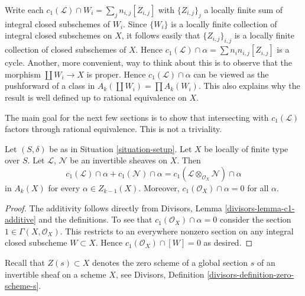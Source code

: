 \noindent
Write each $c_1(\mathcal{L}) \cap W_i = \sum_j n_{i, j} [Z_{i, j}]$
with $\{Z_{i, j}\}_j$ a locally finite sum
of integral closed subschemes of $W_i$. Since $\{W_i\}$ is a locally
finite collection of integral closed subschemes on $X$, it follows
easily that $\{Z_{i, j}\}_{i, j}$ is a locally finite collection
of closed subschemes of $X$. Hence
$c_1(\mathcal{L}) \cap \alpha = \sum n_in_{i, j}[Z_{i, j}]$
is a cycle. Another, more convenient, way to think about this
is to observe that the morphism $\coprod W_i \to X$ is
proper. Hence $c_1(\mathcal{L}) \cap \alpha$ can be viewed
as the pushforward of a class in $A_k(\coprod W_i) = \prod A_k(W_i)$.
This also explains why the result is well defined up to rational
equivalence on $X$.

\medskip\noindent
The main goal for the next few sections is to show that intersecting with
$c_1(\mathcal{L})$ factors through rational equivalence.
This is not a triviality.

\begin{lemma}
\label{lemma-c1-cap-additive}
Let $(S, \delta)$ be as in Situation \ref{situation-setup}.
Let $X$ be locally of finite type over $S$.
Let $\mathcal{L}$, $\mathcal{N}$ be an invertible sheaves on $X$.
Then
$$
c_1(\mathcal{L}) \cap \alpha  + c_1(\mathcal{N}) \cap \alpha =
c_1(\mathcal{L} \otimes_{\mathcal{O}_X} \mathcal{N}) \cap \alpha
$$
in $A_k(X)$ for every $\alpha \in Z_{k - 1}(X)$. Moreover,
$c_1(\mathcal{O}_X) \cap \alpha = 0$ for all $\alpha$.
\end{lemma}

\begin{proof}
The additivity follows directly from
Divisors, Lemma \ref{divisors-lemma-c1-additive}
and the definitions. To see that $c_1(\mathcal{O}_X) \cap \alpha = 0$
consider the section $1 \in \Gamma(X, \mathcal{O}_X)$. This restricts
to an everywhere nonzero section on any integral closed subscheme
$W \subset X$. Hence $c_1(\mathcal{O}_X) \cap [W] = 0$ as desired.
\end{proof}

\noindent
Recall that $Z(s) \subset X$ denotes the zero scheme of a global section
$s$ of an invertible sheaf on a scheme $X$, see
Divisors, Definition \ref{divisors-definition-zero-scheme-s}.

